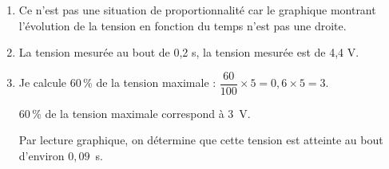 
\medskip

\begin{enumerate}
\item Ce n'est pas une situation de proportionnalité car le graphique montrant
l'évolution de la tension en fonction du temps n'est pas une droite.
\item La tension mesurée au bout de 0,2 s, la tension mesurée est de 4,4 V.
\item Je calcule 60\,\% de la tension maximale : $\dfrac{60}{100} \times 5 = 0,6 \times 5 = 3$.

60\,\% de la tension maximale correspond à 3~V.

Par lecture graphique, on détermine que cette tension est atteinte au bout
d'environ $0,09$~s.
\end{enumerate}

\bigskip

